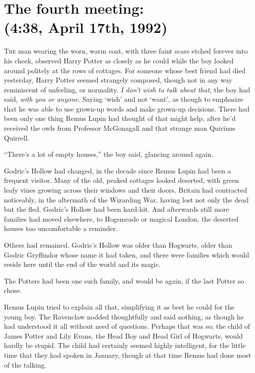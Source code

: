 
\section[The fourth meeting:\\
(4:38\pm, April 17th, 1992)]{The fourth meeting:\\
(4:38\pm, April 17th, 1992)\protect\footnotemark}

\lettrine{T}{he} man wearing the worn, warm coat, with three faint scars etched forever into his cheek, observed Harry Potter as closely as he could while the boy looked around politely at the rows of cottages. For someone whose best friend had died yesterday, Harry Potter seemed strangely composed, though not in any way reminiscent of unfeeling, or normality. \emph{I don’t wish to talk about that,} the boy had said, \emph{with you or anyone.} Saying ‘wish’ and not ‘want’, as though to emphasize that he was able to use grown-up words and make grown-up decisions. There had been only one thing Remus Lupin had thought of that might help, after he’d received the owls from Professor McGonagall and that strange man Quirinus Quirrell.

“There’s a lot of empty houses,” the boy said, glancing around again.

Godric’s Hollow had changed, in the decade since Remus Lupin had been a frequent visitor. Many of the old, peaked cottages looked deserted, with green leafy vines growing across their windows and their doors. Britain had contracted noticeably, in the aftermath of the Wizarding War, having lost not only the dead but the fled. Godric’s Hollow had been hard-hit. And afterwards still more families had moved elsewhere, to Hogsmeade or magical London, the deserted houses too uncomfortable a reminder.

Others had remained. Godric’s Hollow was older than Hogwarts, older than Godric Gryffindor whose name it had taken, and there were families which would reside here until the end of the world and its magic.

The Potters had been one such family, and would be again, if the last Potter so chose.

Remus Lupin tried to explain all that, simplifying it as best he could for the young boy. The Ravenclaw nodded thoughtfully and said nothing, as though he had understood it all without need of questions. Perhaps that was so; the child of James Potter and Lily Evans, the Head Boy and Head Girl of Hogwarts, would hardly be stupid. The child had certainly seemed highly intelligent, for the little time that they had spoken in January, though at that time Remus had done most of the talking.

